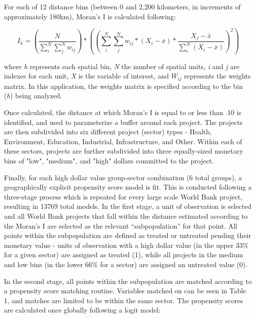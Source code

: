 \documentclass{article}\usepackage[]{graphicx}\usepackage[]{color}
\newenvironment{knitrout}{}{}  %
\begin{document}
\begin{knitrout}
\par
For each of 12 distance bins (between 0 and 2,200 kilometers, in increments of approximately 180km), Moran's I is calculated following:

\begin{equation}
I_h = (\frac{N}{\sum_{i}^{N}\sum_{j}^{N}w_{ij}}) * ((\sum_{i}^{N}\sum_{j}^{N}w_{ij} * (X_{i}-\bar{x}) * \frac{X_{j} - \bar{x}}{\sum_{i}^{N}(X_{i}-\bar{x})})^{2})
\label{EQmoran}
\end{equation}

where \textit{h} represents each spatial bin, \textit{N} the number of spatial units, \textit{i} and \textit{j} are indexes for each unit, \textit{X} is the variable of interest, and \begin{math}W_{ij}\end{math} represents the weights matrix.  
In this application, the weights matrix is specified according to the bin (\textit{h}) being analyzed.  

\par
Once calculated, the distance at which Moran's I is equal to or less than .10 is identified, and used to parameterize a buffer around each project. 
The projects are then subdivided into six different project (sector) types - Health, Environment, Education, Industrial, Infrastructure, and Other.  
Within each of these sectors, projects are further subdivided into three equally-sized monetary bins of "low", "medium", and "high" dollars committed to the project.

\par

Finally, for each high dollar value group-sector combination (6 total groups), a geographically explicit propensity score model is fit.  
This is conducted following a three-stage process which is repeated for every large scale World Bank project, resulting in 13769 total models.
In the first stage, a unit of observation is selected and all World Bank projects that fall within the distance estimated according to the Moran's I are selected as the relevant ``subpopulation'' for that point.
All points within the subpopulation are defined as treated or untreated pending their monetary value - units of observation with a high dollar value (in the upper 33\% for a given sector) are assigned as treated (1), while all projects in the medium and low bins (in the lower 66\% for a sector) are assigned an untreated value (0).

\par
In the second stage, all points within the subpopulation are matched according to a propensity score matching routine.  
Variables matched on can be seen in Table 1, and matches are limited to be within the same sector. 
The propensity scores are calculated once globally following a logit model:


\end{knitrout}
\end{document}
